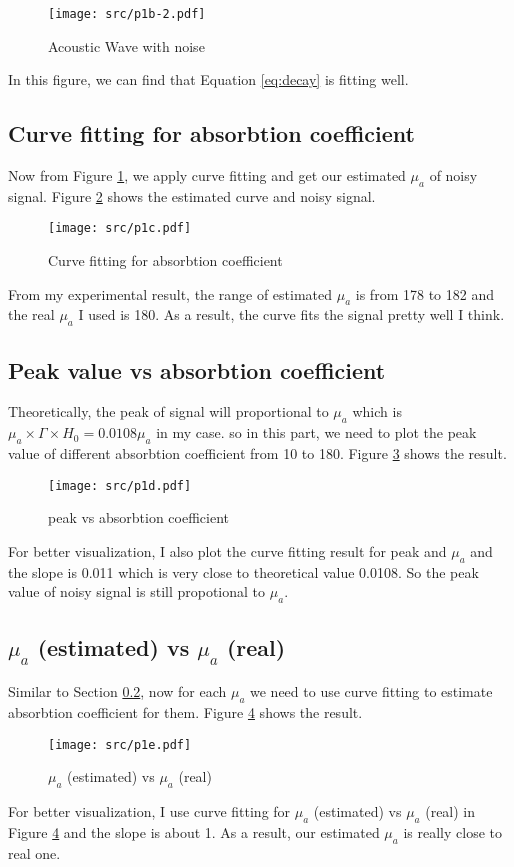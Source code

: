 \documentclass{article}
\begin{document}
\begin{figure}[H]
    \centering
    \texttt{[image: src/p1b-2.pdf]}
    \caption{Acoustic Wave with noise}
    \label{fig:p1b-2}
\end{figure}
In this figure, we can find that Equation \ref{eq:decay} is fitting well.


\subsection{Curve fitting for absorbtion coefficient}
Now from Figure \ref{fig:p1b-2}, we apply curve fitting and get our estimated $\mu_a$ of noisy signal. Figure \ref{fig:p1c} 
shows the estimated curve and noisy signal.

\begin{figure}[H]
    \centering
    \texttt{[image: src/p1c.pdf]}
    \caption{Curve fitting for absorbtion coefficient}
    \label{fig:p1c}
\end{figure}

From my experimental result, the range of estimated $\mu_a$ is from 178 to 182 and the real $\mu_a$ I used is 180. 
As a result, the curve fits the signal pretty well I think.


\subsection{Peak value vs absorbtion coefficient}
\label{sec:p1d}
Theoretically, the peak of signal will proportional to $\mu_a$ which is $\mu_a \times \Gamma \times H_0 = 0.0108\mu_a$ in my case. 
so in this part, we need to plot the peak value of different absorbtion coefficient from 10 to 180. Figure \ref{fig:p1d} 
shows the result.
\begin{figure}[H]
    \centering
    \texttt{[image: src/p1d.pdf]}
    \caption{peak vs absorbtion coefficient}
    \label{fig:p1d}
\end{figure}
For better visualization, I also plot the curve fitting result for peak and $\mu_a$ and the slope is 0.011 which is very close to
theoretical value 0.0108. So the peak value of noisy signal is still propotional to $\mu_a$.


\subsection{$\mu_a$ (estimated) vs $\mu_a$ (real)}
Similar to Section \ref{sec:p1d}, now for each $\mu_a$ we need to use curve fitting to estimate absorbtion coefficient for them. 
Figure \ref{fig:p1e} shows the result.
\begin{figure}[H]
    \centering
    \texttt{[image: src/p1e.pdf]}
    \caption{$\mu_a$ (estimated) vs $\mu_a$ (real)}
    \label{fig:p1e}
\end{figure}
For better visualization, I use curve fitting for $\mu_a$ (estimated) vs $\mu_a$ (real) in Figure \ref{fig:p1e} and the slope 
is about 1. As a result, our estimated $\mu_a$ is really close to real one.
\end{document}
